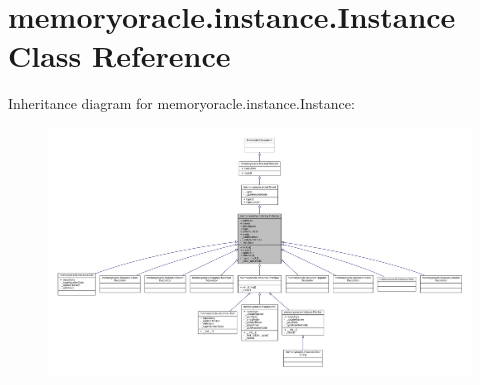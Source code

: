 \hypertarget{classmemoryoracle_1_1instance_1_1Instance}{}\section{memoryoracle.\+instance.\+Instance Class Reference}
\label{classmemoryoracle_1_1instance_1_1Instance}


Inheritance diagram for memoryoracle.\+instance.\+Instance\+:
\nopagebreak
\begin{figure}[H]
\begin{center}
\leavevmode
\includegraphics[width=350pt]{classmemoryoracle_1_1instance_1_1Instance__inherit__graph}
\end{center}
\end{figure}


